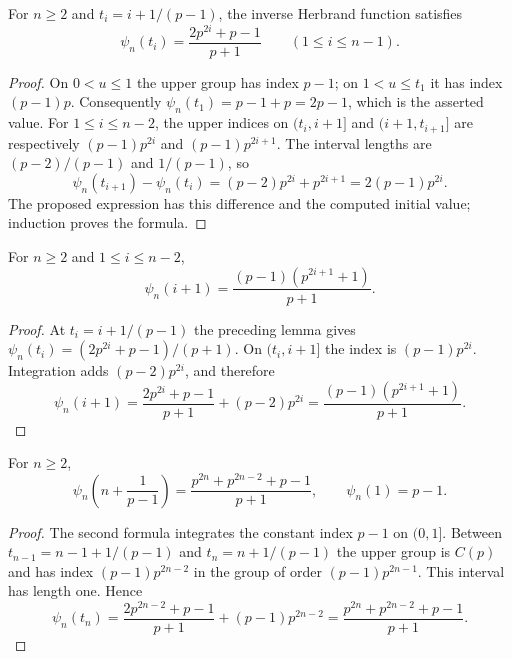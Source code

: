 \begin{lemma}
\label{ft:fractional-break-index}
\leanok
{}
For $n\geq2$ and $t_i=i+1/(p-1)$, the inverse Herbrand function satisfies
\[
 \psi_n(t_i)=\frac{2p^{2i}+p-1}{p+1}
 \qquad(1\leq i\leq n-1).
\]
\end{lemma}
\begin{proof}
On $0<u\leq1$ the upper group has index $p-1$; on
$1<u\leq t_1$ it has index $(p-1)p$.
Consequently $\psi_n(t_1)=p-1+p=2p-1$, which is the asserted value.
For $1\leq i\leq n-2$, the upper indices on
$(t_i,i+1]$ and $(i+1,t_{i+1}]$ are respectively
$(p-1)p^{2i}$ and $(p-1)p^{2i+1}$.
The interval lengths are $(p-2)/(p-1)$ and $1/(p-1)$, so
\[
 \psi_n(t_{i+1})-\psi_n(t_i)
   =(p-2)p^{2i}+p^{2i+1}=2(p-1)p^{2i}.
\]
The proposed expression has this difference and the computed initial
value; induction proves the formula.
\end{proof}

\begin{lemma}
\label{ft:integer-break-index}
\leanok{}
For $n\geq2$ and $1\leq i\leq n-2$,
\[
 \psi_n(i+1)=\frac{(p-1)(p^{2i+1}+1)}{p+1}.
\]
\end{lemma}
\begin{proof}
At $t_i=i+1/(p-1)$ the preceding lemma gives
$\psi_n(t_i)=(2p^{2i}+p-1)/(p+1)$. On $(t_i,i+1]$ the index is
$(p-1)p^{2i}$. Integration adds $(p-2)p^{2i}$, and therefore
\[
 \psi_n(i+1)=\frac{2p^{2i}+p-1}{p+1}+(p-2)p^{2i}
            =\frac{(p-1)(p^{2i+1}+1)}{p+1}.
\]
\end{proof}

\begin{lemma}
\label{ft:final-break-index}
\leanok{}
For $n\geq2$,
\[
 \psi_n\left(n+\frac1{p-1}\right)
  =\frac{p^{2n}+p^{2n-2}+p-1}{p+1},\qquad
 \psi_n(1)=p-1.
\]
\end{lemma}
\begin{proof}
The second formula integrates the constant index $p-1$ on $(0,1]$.
Between $t_{n-1}=n-1+1/(p-1)$ and $t_n=n+1/(p-1)$ the upper group
is $C(p)$ and has index $(p-1)p^{2n-2}$ in the group of order
$(p-1)p^{2n-1}$. This interval has length one. Hence
\[
 \psi_n(t_n)=\frac{2p^{2n-2}+p-1}{p+1}+(p-1)p^{2n-2}
            =\frac{p^{2n}+p^{2n-2}+p-1}{p+1}.
\]
\end{proof}

